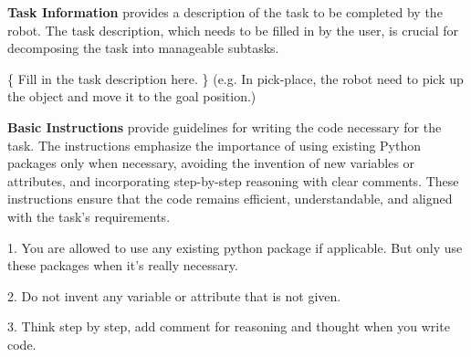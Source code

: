 \textbf{Task Information}
provides a description of the task to be completed by the robot. The task description, which needs to be filled in by the user, is crucial for decomposing the task into manageable subtasks.
\begin{tcolorbox}[colframe=kuangyellow, colback=backgroundyellow, coltitle=black, title={Task Information}, breakable]
\{ Fill in the task description here. \} (e.g. In pick-place, the robot need to pick up the object and move it to the goal position.)
\end{tcolorbox}

\textbf{Basic Instructions}
provide guidelines for writing the code necessary for the task. The instructions emphasize the importance of using existing Python packages only when necessary, avoiding the invention of new variables or attributes, and incorporating step-by-step reasoning with clear comments. These instructions ensure that the code remains efficient, understandable, and aligned with the task's requirements.
\begin{tcolorbox}[colframe=kuangyellow, colback=backgroundyellow, coltitle=black, title={Basic Instruction}, breakable]
1. You are allowed to use any existing python package if applicable. But only use these packages when it's really necessary.

\vspace{2pt}

2. Do not invent any variable or attribute that is not given.

\vspace{2pt}

3. Think step by step, add comment for reasoning and thought when you write code.
\end{tcolorbox}

